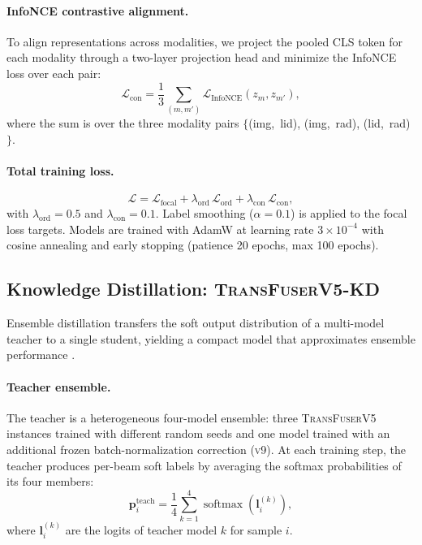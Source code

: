 \documentclass[journal,10pt,twoside]{IEEEtran}
\newcommand{\ours}{\textsc{TransFuserV5}}
\newcommand{\distill}{\textsc{TransFuserV5-KD}}
\begin{document}
\paragraph{InfoNCE contrastive alignment.}
To align representations across modalities, we project the pooled CLS token for
each modality through a two-layer projection head and minimize the InfoNCE loss
\cite{oord2018cpc} over each pair:
\begin{equation}
  \mathcal{L}_{\text{con}}
    = \frac{1}{3}\sum_{(m,m')} \mathcal{L}_{\text{InfoNCE}}(z_m, z_{m'}),
  \label{eq:infonce}
\end{equation}
where the sum is over the three modality pairs $\{$(img,~lid), (img,~rad),
(lid,~rad)$\}$.

\paragraph{Total training loss.}
\begin{equation}
  \mathcal{L} = \mathcal{L}_{\text{focal}}
              + \lambda_{\text{ord}}\,\mathcal{L}_{\text{ord}}
              + \lambda_{\text{con}}\,\mathcal{L}_{\text{con}},
  \label{eq:total_loss}
\end{equation}
with $\lambda_{\text{ord}} = 0.5$ and $\lambda_{\text{con}} = 0.1$.
Label smoothing ($\alpha = 0.1$) is applied to the focal loss targets.
Models are trained with AdamW \cite{loshchilov2019adamw} at learning rate
$3 \times 10^{-4}$ with cosine annealing \cite{loshchilov2017sgdr} and
early stopping (patience 20 epochs, max 100 epochs).

\subsection{Knowledge Distillation: \distill{}}
\label{sec:kd}

Ensemble distillation transfers the soft output distribution of a multi-model
teacher to a single student, yielding a compact model that approximates ensemble
performance \cite{Hinton2015KD,Allen2020ensemble}.

\paragraph{Teacher ensemble.}
The teacher is a heterogeneous four-model ensemble: three \ours{} instances
trained with different random seeds and one model trained with an
additional frozen batch-normalization correction (\textsc{v9}).
At each training step, the teacher produces per-beam soft labels by averaging
the softmax probabilities of its four members:
\begin{equation}
  \mathbf{p}^{\text{teach}}_i
    = \frac{1}{4} \sum_{k=1}^{4} \operatorname{softmax}(\mathbf{l}^{(k)}_i),
  \label{eq:teacher}
\end{equation}
where $\mathbf{l}^{(k)}_i$ are the logits of teacher model $k$ for sample $i$.
\end{document}
